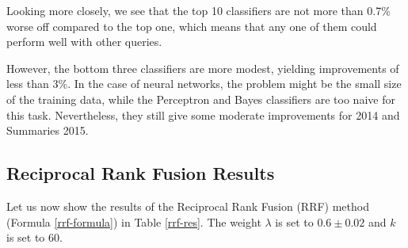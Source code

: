 Looking more closely, we see that the top 10 classifiers are not more than 0.7\% worse off compared to the top one,
which means that any one of them could perform well with other queries.

However, the bottom three classifiers are more modest, yielding improvements of less than 3\%.
In the case of neural networks, the problem might be the small size of the training data,
while the Perceptron and Bayes classifiers are too naive for this task.
Nevertheless, they still give some moderate improvements for 2014 and Summaries 2015.

\subsection{Reciprocal Rank Fusion Results}
Let us now show the results of the Reciprocal Rank Fusion (RRF) method (Formula \ref{rrf-formula}) in Table \ref{rrf-res}.
The weight $\lambda$ is set to $0.6\pm 0.02$ and $k$ is set to 60.

